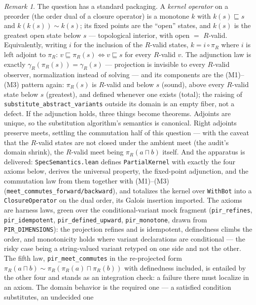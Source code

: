 \documentclass[11pt]{article}
\theoremstyle{definition}
\theoremstyle{remark}
\newtheorem{remark}[theorem]{Remark}
\newcommand{\sat}{\sqsubseteq}
\renewcommand{\ker}{\sim}
\newcommand{\meet}{\sqcap}
\newcommand{\denR}[1]{\gamma_{R}(#1)}
\newcommand{\code}[1]{\texttt{#1}}
\begin{document}
\begin{remark}\label{rem:kernel}
The question has a standard packaging.  A \emph{kernel operator} on a
preorder (the order dual of a closure operator) is a monotone $k$ with
$k(s) \sat s$ and $k(k(s)) \ker k(s)$; its fixed points are the ``open''
states, and $k(s)$ is the greatest open state below $s$ --- topological
interior, with open $=$ $R$-valid.  Equivalently, writing $i$ for the
inclusion of the $R$-valid states, $k = i \circ \pi_R$ where $i$ is left
adjoint to $\pi_R$: $v \sat \pi_R(s) \iff v \sat s$ for every $R$-valid
$v$.  The adjunction law is exactly $\denR{\pi_R(s)} = \denR{s}$ ---
projection is invisible to every $R$-valid observer, normalization instead
of solving --- and its components are the (M1)--(M3) pattern again:
$\pi_R(s)$ is $R$-valid and below $s$ (sound), above every $R$-valid state
below $s$ (greatest), and defined whenever one exists (total); the raising
of \code{substitute\_abstract\_variants} outside its domain is an empty
fiber, not a defect.  If the adjunction holds, three things become
theorems.  Adjoints are unique, so the substitution algorithm's semantics
is canonical.  Right adjoints preserve meets, settling the commutation
half of this question --- with the caveat that the $R$-valid states are
not closed under the ambient meet (the audit's domain shrink), the
$R$-valid meet being $\pi_R(a \meet b)$ itself.  And the apparatus is
delivered: \code{SpecSemantics.lean} defines \code{PartialKernel} with
exactly the four axioms below, derives the universal property, the
fixed-point adjunction, and the commutation law from them together with
(M1)--(M3) (\code{meet\_commutes\_forward/backward}), and totalizes the
kernel over \code{WithBot} into a \code{ClosureOperator} on the dual
order, its Galois insertion imported.  The axioms are harness laws, green
over the conditional-variant mock fragment (\code{pir\_refines},
\code{pir\_idempotent}, \code{pir\_defined\_upward}, \code{pir\_monotone},
drawn from \code{PIR\_DIMENSIONS}): the projection refines and is
idempotent, definedness climbs the order, and monotonicity holds where
variant declarations are conditional --- the risky case being a
string-valued variant retyped on one side and not the other.  The fifth
law, \code{pir\_meet\_commutes} in the re-projected form
$\pi_R(a \meet b) \ker \pi_R(\pi_R(a) \meet \pi_R(b))$ with definedness
included, is entailed by the other four and stands as an integration
check: a failure there must localize in an axiom.  The domain behavior is
the required one --- a satisfied condition substitutes, an undecided one

\end{remark}
\end{document}

